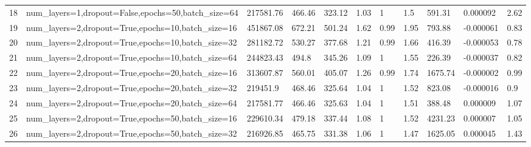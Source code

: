 \begin{longtable}{C{0.8cm} L{2cm} C{1.15cm} C{1.15cm} C{1.15cm} C{1.15cm} C{0.85cm} C{1.25cm} C{1.2cm} C{1.5cm} C{1.0cm}}
18 & num\_layers=1,\newline dropout=False,\newline epochs=50,\newline batch\_size=64 & 217581.76 & 466.46 & 323.12 & 1.03 & 1 & 1.5 & 591.31 & 0.000092 & 2.62 \\
19 & num\_layers=2,\newline dropout=True,\newline epochs=10,\newline batch\_size=16 & 451867.08 & 672.21 & 501.24 & 1.62 & 0.99 & 1.95 & 793.88 & -0.000061 & 0.83 \\
20 & num\_layers=2,\newline dropout=True,\newline epochs=10,\newline batch\_size=32 & 281182.72 & 530.27 & 377.68 & 1.21 & 0.99 & 1.66 & 416.39 & -0.000053 & 0.78 \\
21 & num\_layers=2,\newline dropout=True,\newline epochs=10,\newline batch\_size=64 & 244823.43 & 494.8 & 345.26 & 1.09 & 1 & 1.55 & 226.39 & -0.000037 & 0.82 \\
22 & num\_layers=2,\newline dropout=True,\newline epochs=20,\newline batch\_size=16 & 313607.87 & 560.01 & 405.07 & 1.26 & 0.99 & 1.74 & 1675.74 & -0.000002 & 0.99 \\
23 & num\_layers=2,\newline dropout=True,\newline epochs=20,\newline batch\_size=32 & 219451.9 & 468.46 & 325.64 & 1.04 & 1 & 1.52 & 823.08 & -0.000016 & 0.9 \\
24 & num\_layers=2,\newline dropout=True,\newline epochs=20,\newline batch\_size=64 & 217581.77 & 466.46 & 325.63 & 1.04 & 1 & 1.51 & 388.48 & 0.000009 & 1.07 \\
25 & num\_layers=2,\newline dropout=True,\newline epochs=50,\newline batch\_size=16 & 229610.34 & 479.18 & 337.44 & 1.08 & 1 & 1.52 & 4231.23 & 0.000007 & 1.05 \\
26 & num\_layers=2,\newline dropout=True,\newline epochs=50,\newline batch\_size=32 & 216926.85 & 465.75 & 331.38 & 1.06 & 1 & 1.47 & 1625.05 & 0.000045 & 1.43 \\

\end{longtable}
